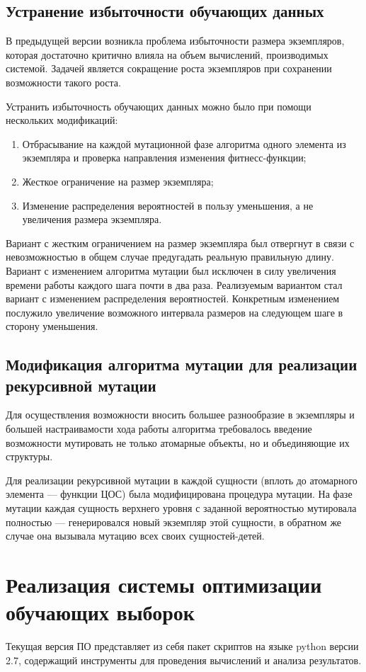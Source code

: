 \documentclass[utf8,usehyperref,14pt]{G7-32}
\begin{document}
\subsection{Устранение избыточности обучающих данных}
В предыдущей версии возникла проблема избыточности размера экземпляров, которая достаточно критично влияла на объем  вычислений, производимых системой. Задачей является сокращение роста экземпляров при сохранении возможности такого роста.

Устранить избыточность обучающих данных можно было при помощи нескольких модификаций:
\begin{enumerate}
\item Отбрасывание на каждой мутационной фазе алгоритма одного элемента из экземпляра и проверка направления изменения фитнесс-функции;
\item Жесткое ограничение на размер экземпляра;
\item Изменение распределения вероятностей в пользу уменьшения, а не увеличения размера экземпляра.
\end{enumerate}
Вариант с жестким ограничением на размер экземпляра был отвергнут в связи с невозможностью в общем случае предугадать реальную правильную длину. Вариант с изменением алгоритма мутации был исключен в силу увеличения времени работы каждого шага почти в два раза. Реализуемым вариантом стал вариант с изменением распределения вероятностей. Конкретным изменением послужило увеличение возможного интервала размеров на следующем шаге в сторону уменьшения.

\subsection{Модификация алгоритма мутации для реализации рекурсивной мутации}
Для осуществления возможности вносить большее разнообразие в экземпляры и большей настраивамости хода работы алгоритма требовалось введение возможности мутировать не только атомарные объекты, но и объединяющие их структуры.

Для реализации рекурсивной мутации в каждой сущности (вплоть до атомарного элемента --- функции ЦОС) была модифицирована процедура мутации. На фазе мутации каждая сущность верхнего уровня с заданной вероятностью мутировала полностью --- генерировался новый экземпляр этой сущности, в обратном же случае она вызывала мутацию всех своих сущностей-детей.

\section{Реализация системы оптимизации обучающих выборок}
Текущая версия ПО представляет из себя пакет скриптов на языке python версии 2.7, содержащий инструменты для проведения вычислений и анализа результатов.
\end{document}
